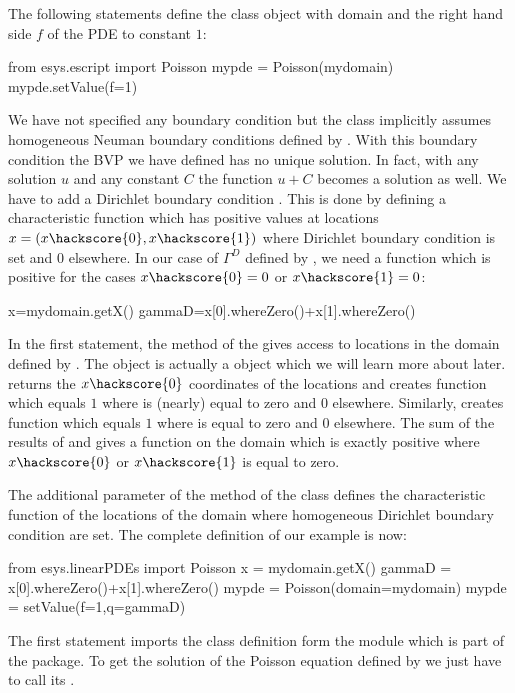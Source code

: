 The following statements define the \Poisson class object  with domain  and
the right hand side $f$ of the PDE to constant $1$: 
\begin{python}
from esys.escript import Poisson
mypde = Poisson(mydomain)
mypde.setValue(f=1)
\end{python}
We have not specified any boundary condition but the 
\Poisson class implicitly assumes homogeneous Neuman boundary conditions  defined by . With this boundary 
condition the BVP we have defined has no unique solution. In fact, with any solution $u$
and any constant $C$ the function $u+C$ becomes a solution as well. We have to add 
a Dirichlet boundary condition . This is done 
by defining a characteristic function  
which has positive values at locations $x=(x\hackscore{0},x\hackscore{1})$ where Dirichlet boundary condition is set
and $0$ elsewhere. In our case of $\Gamma^D$ defined by ,
we need a function which is positive for the cases $x\hackscore{0}=0$ or $x\hackscore{1}=0$:   
\begin{python}
x=mydomain.getX()
gammaD=x[0].whereZero()+x[1].whereZero()
\end{python}
In the first statement, the method  of the \Domain {} 
gives access to locations 
in the domain defined by . The object  is actually a \Data object
which we will learn more about later.  returns the $x\hackscore{0}$ coordinates of the locations and
 creates function which equals $1$ where  is (nearly) equal to zero 
and $0$ elsewhere. 
Similarly,  creates function which equals $1$ where  is 
equal to zero and $0$ elsewhere.
The sum of the results of  and  gives a function on the domain  which is exactly positive where $x\hackscore{0}$ or $x\hackscore{1}$ is equal to zero.

The additional parameter  of the  method of the \Poisson class defines the 
characteristic function  of the locations
of the domain where homogeneous Dirichlet boundary condition 
are set. The complete definition of our example is now: 
\begin{python}
from esys.linearPDEs import Poisson
x = mydomain.getX()
gammaD = x[0].whereZero()+x[1].whereZero()
mypde = Poisson(domain=mydomain)
mypde = setValue(f=1,q=gammaD)
\end{python}
The first statement imports the \Poisson class definition form the \linearPDEsPack module which is part of the \ESyS package.
To get the solution of the Poisson equation defined by  we just have to call its
. 

